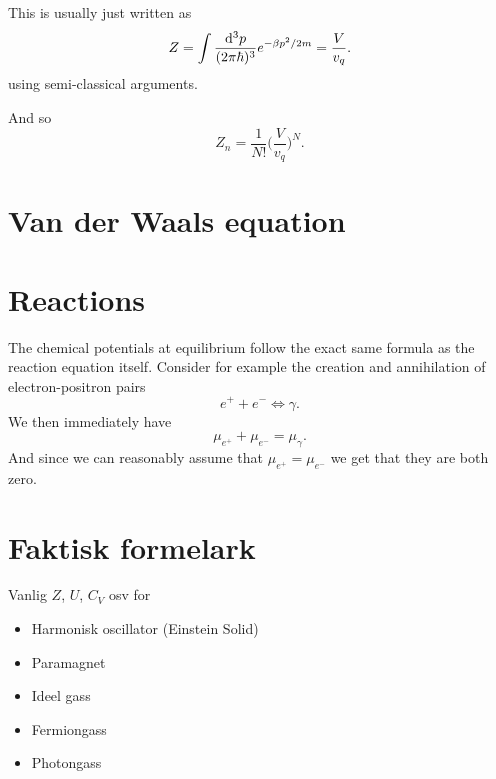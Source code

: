 \documentclass[a4paper, 11pt, notitlepage, english]{article}
\renewcommand{\d}{{\rm d}}
\begin{document}
This is usually just written as
$$Z = \int \frac{\d^3 p}{(2\pi \hbar)^3} e^{-\beta p^2/2m} = \frac{V}{v_q}.$$
using semi-classical arguments.

And so $$Z_n = \frac{1}{N!}\bigg(\frac{V}{v_q}\bigg)^N.$$

\section*{Van der Waals equation}

\clearpage

\section*{Reactions}

The chemical potentials at equilibrium follow the exact same formula as the reaction equation itself. Consider for example the creation and annihilation of electron-positron pairs
$$e^{+} + e^{-} \Leftrightarrow \gamma.$$
We then immediately have
$$\mu_{e^+} + \mu_{e^-} = \mu_\gamma.$$
And since we can reasonably assume that $\mu_{e^+} = \mu_{e^-}$ we get that they are both zero.  

\clearpage

\section*{Faktisk formelark}

Vanlig $Z$, $U$, $C_V$ osv for
\begin{itemize}
	\item Harmonisk oscillator (Einstein Solid)
	\item Paramagnet
	\item Ideel gass
	\item Fermiongass
	\item Photongass
\end{itemize}
\end{document}
